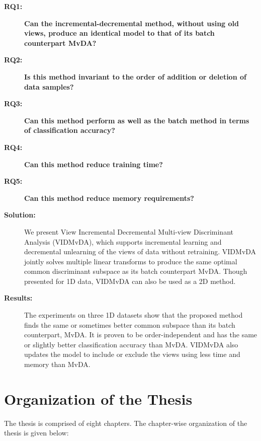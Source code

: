 \begin{description}
\item[\textbf{RQ1: }] \textbf{Can the incremental-decremental method, without using old views, produce an identical model to that of its batch counterpart MvDA?}

\item[\textbf{RQ2: }] \textbf{Is this method invariant to the order of addition or deletion of data samples?}

\item[\textbf{RQ3: }] \textbf{Can this method perform as well as the batch method in terms of classification accuracy?}

\item[\textbf{RQ4: }] \textbf{Can this method reduce training time?}

\item[\textbf{RQ5: }] \textbf{Can this method reduce memory requirements?}

\item[\textbf{Solution:}] We present View Incremental Decremental Multi-view Discriminant Analysis (VIDMvDA), which supports incremental learning and decremental unlearning of the views of data without retraining. VIDMvDA jointly solves multiple linear transforms to produce the same optimal common discriminant subspace as its batch counterpart MvDA. Though presented for 1D data, VIDMvDA can also be used as a 2D method.

\item[\textbf{Results:}] The experiments on three 1D datasets show that the proposed method finds the same or sometimes better common subspace than its batch counterpart, MvDA. It is proven to be order-independent and has the same or slightly better classification accuracy than MvDA. VIDMvDA also updates the model to include or exclude the views using less time and memory than MvDA.
\end{description}











\section{Organization of the Thesis}
\label{sec:Organization}
The thesis is comprised of eight chapters. The chapter-wise organization of the thesis is given below: 

